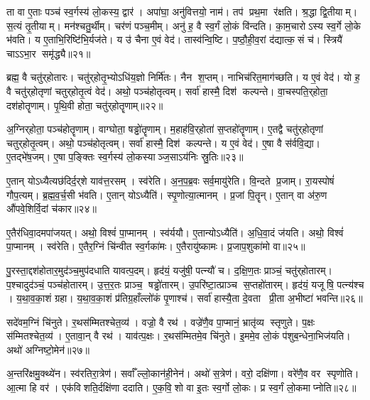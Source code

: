    ता वा ए॒ताः पञ्च॑ स्व॒र्गस्य॑ लो॒कस्य॒ द्वार॑।
   अपा॑घा॒ अनु॑वित्तयो॒ नाम॑।
   तप॑ प्रथ॒मा र॑क्षति।
   श्र॒द्धा द्वि॒तीयाम्।
   स॒त्यं तृ॒तीयाम्।
   मन॑श्चतु॒र्थीम्।
   चर॑णं पञ्च॒मीम्।
   अनु॑ ह॒ वै स्व॒र्गं लो॒कं वि॑न्दति।
   का॒म॒चारोऽस्य स्व॒र्गे लो॒के भ॑वति।
   य ए॒ताभि॒रिष्टि॑भि॒र्यज॑ते।
   य उ॑ चैना ए॒वं वेद॑।
   तास्व॑न्वि॒ष्टि।
   प॒ष्ठौ॒ही॒व॒रां द॑द्यात्क॒सं च॑।
   स्त्रियै॑ चाऽऽभा॒र समृ॑द्ध्यै॥२१॥
\anuvakamend
  
   ब्रह्म॒ वै चतु॑र्‌होतारः।
   चतु॑र्‌होतृ॒भ्योऽधि॑य॒ज्ञो निर्मि॑तः।
   नैन श॒प्तम्।
   नाभिच॑रित॒माग॑च्छति।
   य ए॒वं वेद॑।
   यो ह॒ वै चतु॑र्‌होतृणां चतुर्‌होतृ॒त्वं वेद॑।
   अथो॒ पञ्च॑होतृत्वम्।
   सर्वा॑ हास्मै॒ दिश॑ कल्पन्ते।
   वा॒चस्पति॒र्‌होता॒ दश॑होतॄणाम्।
   पृ॒थि॒वी होता॒ चतु॑र्‌होतॄणाम्॥२२॥

   अ॒ग्निर्‌होता॒ पञ्च॑होतॄणाम्।
   वाग्घोता॒ षड्ढो॑तॄणाम्।
   म॒हाह॑वि॒र्‌होता॑ स॒प्तहो॑तॄणाम्।
   ए॒तद्वै चतु॑र्‌होतृणां चतुर्‌होतृ॒त्वम्।
   अथो॒ पञ्च॑होतृत्वम्।
   सर्वा॑ हास्मै॒ दिश॑ कल्पन्ते।
   य ए॒वं वेद॑।
   ए॒षा वै स॑र्ववि॒द्या।
   ए॒तद्भे॑ष॒जम्।
   ए॒षा प॒ङ्क्तिः स्व॒र्गस्य॑ लो॒कस्याञ्ज॒साऽय॑निः स्रु॒तिः॥२३॥

   ए॒तान् योऽध्यैत्यछ॑दिर्द॒र्‌शे याव॑त्त॒रसम्।
   स्व॑रेति।
   अ॒न॒प॒ब्र॒वः सर्व॒मायु॑रेति।
   वि॒न्दते प्र॒जाम्।
   रा॒यस्पोषं॑ गौप॒त्यम्।
   ब्र॒ह्म॒व॒र्च॒सी भ॑वति।
   ए॒तान् योऽध्यैति॑।
   स्पृ॒णोत्या॒त्मानम्।
   प्र॒जां पि॒तॄन्।
   ए॒तान् वा अ॑रु॒ण औ॑पवे॒शिर्वि॒दां च॑कार॥२४॥

   ए॒तैर॑धिवा॒दमपा॑जयत्।
   अथो॒ विश्वं॑ पा॒प्मानम्।
   स्व॑र्ययौ।
   ए॒तान्योऽध्यैति॑।
   अ॒धि॒वा॒दं ज॑यति।
   अथो॒ विश्वं॑ पा॒प्मानम्।
   स्व॑रेति।
   ए॒तैर॒ग्निं चि॑न्वीत स्व॒र्गका॑मः।
   ए॒तैरायु॑ष्कामः।
   प्र॒जाप॒शुका॑मो वा॥२५॥

   पु॒रस्ता॒द्दश॑होतार॒मुद॑ञ्च॒मुप॑दधाति यावत्प॒दम्।
   हृद॑यं॒ यजु॑षी॒ पत्न्यौ॑ च।
   द॒क्षि॒ण॒तः प्राञ्चं॒ चतु॑र्‌होतारम्।
   प॒श्चादुद॑ञ्चं॒ पञ्च॑होतारम्।
   उ॒त्त॒र॒तः प्राञ्च॒ षड्ढो॑तारम्।
   उ॒परि॑ष्टा॒त्प्राञ्च स॒प्तहो॑तारम्।
   हृद॑यं॒ यजूषि॒ पत्न्य॑श्च ।
   य॒था॒व॒का॒शं ग्रहा\sn{}।
   य॒था॒व॒का॒शं प्र॑तिग्र॒हाँल्लो॑कं  पृ॒णाश्च॑।
   सर्वा॑ हास्यै॒ता दे॒वता प्री॒ता अ॒भीष्टा॑ भवन्ति॥२६॥

   सदे॑वम॒ग्निं चि॑नुते।
   र॒थस॑म्मितश्चेत॒व्य॑।
   वज्रो॒ वै रथ॑।
   वज्रे॑णै॒व पा॒प्मानं॒ भ्रातृ॑व्य स्तृणुते।
   प॒क्षः स॑म्मितश्चेत॒व्य॑।
   ए॒तावा॒न् वै रथ॑।
   याव॑त्प॒क्षः।
   र॒थस॑म्मितमे॒व चि॑नुते।
   इ॒ममे॒व लो॒कं प॑शुब॒न्धेना॒भिज॑यति।
   अथो॑ अग्निष्टो॒मेन॑॥२७॥

   अ॒न्तरि॑क्षमु॒क्थ्ये॑न।
   स्व॑रतिरा॒त्रेण॑।
   सर्वाँल्लो॒कान॑ही॒नेन॑।
   अथो॑ स॒त्रेण॑।
   वरो॒ दक्षि॑णा।
   वरे॑णै॒व वर स्पृणोति।
   आ॒त्मा हि वर॑।
   एक॑विशति॒र्दक्षि॑णा ददाति।
   ए॒क॒वि॒शो वा इ॒तः स्व॒र्गो लो॒कः।
   प्र स्व॒र्गं लो॒कमाप्नोति॥२८॥

